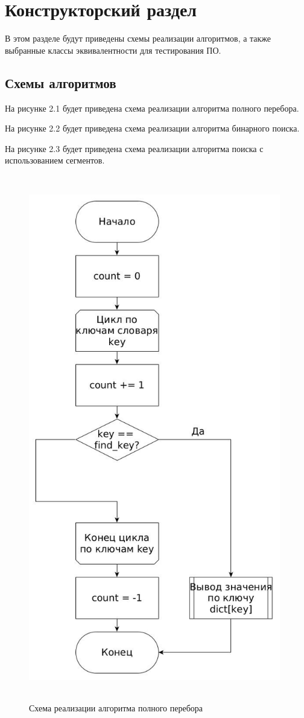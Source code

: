 \chapter{Конструкторский раздел}
В этом разделе будут приведены схемы реализации алгоритмов,
а также выбранные классы эквивалентности для тестирования ПО.

\section{Схемы алгоритмов}
На рисунке 2.1 будет приведена схема реализации алгоритма полного перебора.

На рисунке 2.2 будет приведена схема реализации алгоритма бинарного поиска.

На рисунке 2.3 будет приведена схема реализации алгоритма поиска с использованием сегментов.

\FloatBarrier
\begin{figure}[hp]
	\begin{center}
		\includegraphics[width=11cm, height=23cm]{graph/full.jpg}
	\end{center}
	\caption{Схема реализации алгоритма полного перебора}
\end{figure}
\FloatBarrier

